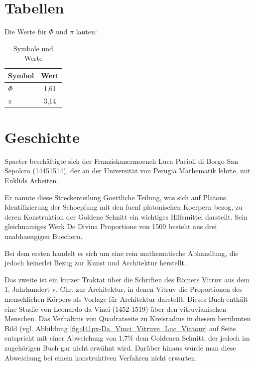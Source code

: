 \documentclass[10pt]{scrartcl}
\begin{document}
\section{Tabellen}
\label{sec:Tabellen}

Die Werte für $\Phi$ und $\pi$ lauten:

\begin{table}[htb]
\begin{center}
\begin{tabular} { | l | c|}
\hline
Symbol & Wert   \\ \hline
$\Phi$ & 1,61   \\
$\pi$ & 3,14    \\ \hline
\end{tabular}
	\caption{Symbole und Werte}
	\label{tab:SymboleUndWerte}
\end{center}
\end{table} 

\section{Geschichte}

Spaeter beschäftigte sich der Franziskanermoench Luca Pacioli di Borgo San Sepolcro (14451514), der an der Universität von Perugia Mathematik lehrte, mit Euklids Arbeiten.

 Er nannte diese Streckenteilung Goettliche Teilung, was sich auf Platons Identifizierung der Schoepfung mit den fuenf platonischen Koerpern bezog, zu deren Konstruktion der Goldene Schnitt ein wichtiges Hilfsmittel darstellt. Sein gleichnamiges Werk De Divina Proportione von 1509 besteht aus drei unabhaengigen Buechern. 
 
Bei dem ersten handelt es sich um eine rein mathematische Abhandlung, die jedoch keinerlei Bezug zur Kunst und Architektur herstellt. 
 
Das zweite ist ein kurzer Traktat über die Schriften des Römers Vitruv aus dem 1. Jahrhundert v. Chr. zur Architektur, in denen Vitruv die Proportionen des menschlichen Körpers als Vorlage für Architektur darstellt. Dieses Buch enthält eine Studie von Leonardo da Vinci (1452-1519) über den vitruvianischen Menschen. Das Verhältnis von Quadratseite zu Kreisradius in diesem berühmten Bild (vgl. Abbildung \ref{fig:441px-Da_Vinci_Vitruve_Luc_Viatour} auf Seite \pageref{fig:441px-Da_Vinci_Vitruve_Luc_Viatour} entspricht mit einer Abweichung von 1,7\% dem Goldenen Schnitt, der jedoch im zugehörigen Buch gar nicht erwähnt wird. Darüber hinaus würde man diese Abweichung bei einem konstruktiven Verfahren nicht erwarten.
\end{document}
